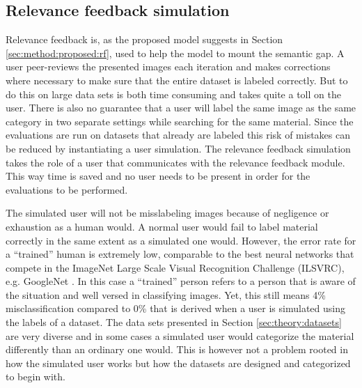 \subsection{Relevance feedback simulation}
\label{sec:method:rf_simulation}
Relevance feedback is, as the proposed model suggests in Section \ref{sec:method:proposed:rf}, used to help the model to mount the semantic gap. A user peer-reviews the presented images each iteration and makes corrections where necessary to make sure that the entire dataset is labeled correctly. But to do this on large data sets is both time consuming and takes quite a toll on the user. There is also no guarantee that a user will label the same image as the same category in two separate settings while searching for the same material. 
Since the evaluations are run on datasets that already are labeled this risk of mistakes can be reduced by instantiating a user simulation. The relevance feedback simulation takes the role of a user that communicates with the relevance feedback module. This way time is saved and no user needs to be present in order for the evaluations to be performed.  

The simulated user will not be misslabeling images because of negligence or exhaustion as a human would. 
A normal user would fail to label material correctly in the same extent as a simulated one would. 
However, the error rate for a ``trained'' human is extremely low, comparable to the best neural networks that compete in the ImageNet Large Scale Visual Recognition Challenge (ILSVRC), e.g. GoogleNet \cite{ImageNetChallenge}. 
In this case a ``trained'' person refers to a person that is aware of the situation and well versed in classifying images. Yet, this still means 4\% misclassification compared to 0\% that is derived when a user is simulated using the labels of a dataset.
The data sets presented in Section \ref{sec:theory:datasets} are very diverse and in some cases a simulated user would categorize the material differently than an ordinary one would. This is however not a problem rooted in how the simulated user works but how the datasets are designed and categorized to begin with.
